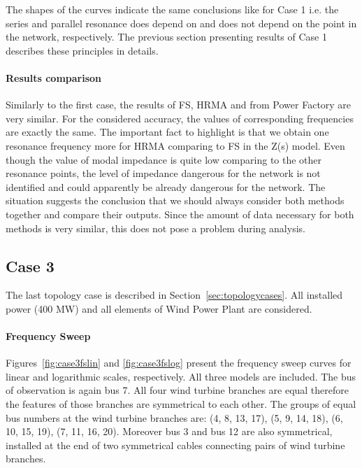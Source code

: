 \documentclass[12pt]{report} %
\begin{document}
The shapes of the curves indicate the same conclusions like for Case 1 i.e. the series and parallel resonance does depend on and does not depend on the point in the network, respectively. The previous section presenting results of Case 1 describes these principles in details.

\paragraph{Results comparison}
Similarly to the first case, the results of FS, HRMA and from Power Factory are very similar. For the considered accuracy, the values of corresponding frequencies are exactly the same. The important fact to highlight is that we obtain one resonance frequency more for HRMA comparing to FS in the Z(s) model. Even though the value of modal impedance is quite low comparing to the other resonance points, the level of impedance dangerous for the network is not identified and could apparently be already dangerous for the network. The situation suggests the conclusion that we should always consider both methods together and compare their outputs. Since the amount of data necessary for both methods is very similar, this does not pose a problem during analysis.

\subsection{Case 3}
The last topology case is described in Section~\ref{sec:topologycases}. All installed power (400 MW) and all elements of Wind Power Plant are considered.

\paragraph{Frequency Sweep}
Figures~\ref{fig:case3fslin} and \ref{fig:case3fslog} present the frequency sweep curves for linear and logarithmic scales, respectively. All three models are included. The bus of observation is again bus 7. All four wind turbine branches are equal therefore the features of those branches are symmetrical to each other. The groups of equal bus numbers at the wind turbine branches are: (4, 8, 13, 17), (5, 9, 14, 18), (6, 10, 15, 19), (7, 11, 16, 20). Moreover bus 3 and bus 12 are also symmetrical, installed at the end of two symmetrical cables connecting pairs of wind turbine branches.
\end{document}
